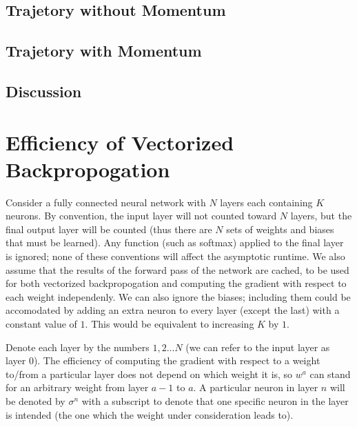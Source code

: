 \documentclass{article}
\begin{document}
   \subsection{Trajetory without Momentum}

   \subsection{Trajetory with Momentum}

   \subsection{Discussion}




   \section{Efficiency of Vectorized Backpropogation}
   Consider a fully connected neural network with $N$ layers each containing $K$ neurons. By convention,
   the input layer will not counted toward $N$ layers, but the final output layer will be
   counted (thus there are $N$ sets of weights and biases that must be learned). Any function
   (such as softmax) applied to the final layer is ignored; none of these conventions will
   affect the asymptotic runtime. We also assume that the results of the forward pass of the
   network are cached, to be used for both vectorized backpropogation and computing the
   gradient with respect to each weight independenly.
   We can also ignore the biases; including them could be accomodated by adding an extra
   neuron to every layer (except the last) with a constant value of $1$. This would be
   equivalent to increasing $K$ by $1$.

   Denote each layer by the numbers $1,2... N$ (we can refer to the input layer as layer $0$).
   The efficiency of computing the gradient with respect to a weight to/from a particular layer
   does not depend on which weight it is, so $w^{a}$ can stand for an arbitrary weight from
   layer $a-1$ to $a$. A particular neuron in layer $n$ will be denoted by $\sigma^n$ with a
   subscript to denote that one specific neuron in the layer is intended (the one which the
   weight under consideration leads to).
\end{document}
